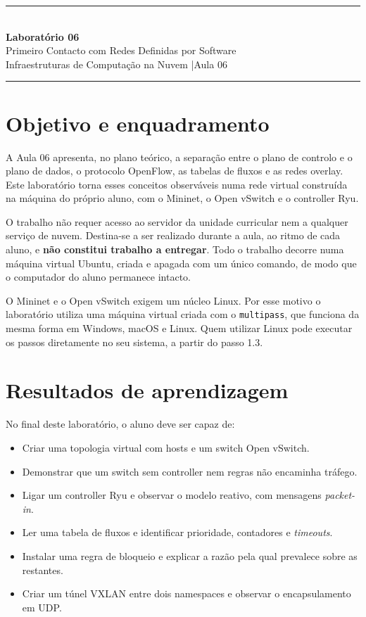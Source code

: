 \documentclass[11pt,a4paper]{article}
\newcommand{\cmd}[1]{\texttt{#1}}
\newcommand{\labtitle}[3]{%
  \thispagestyle{empty}
  \begin{center}
  {\color{NudeTaupe}\rule{\textwidth}{0.5pt}}\\[0.6cm]
  {\LARGE\bfseries\color{TextEspresso} Laboratório #1}\\[0.4cm]
  {\large\color{TextEspresso} #2}\\[0.35cm]
  {\normalsize\color{NudeTaupe} Infraestruturas de Computação na Nuvem \quad|\quad #3}\\[0.5cm]
  {\color{NudeTaupe}\rule{\textwidth}{0.5pt}}
  \end{center}
  \vspace{0.5cm}
}
\begin{document}
\labtitle{06}{Primeiro Contacto com Redes Definidas por Software}{Aula 06}

\section*{Objetivo e enquadramento}

A Aula 06 apresenta, no plano teórico, a separação entre o plano de controlo e o plano de dados, o protocolo OpenFlow, as tabelas de fluxos e as redes overlay. Este laboratório torna esses conceitos observáveis numa rede virtual construída na máquina do próprio aluno, com o Mininet, o Open vSwitch e o controller Ryu.

O trabalho não requer acesso ao servidor da unidade curricular nem a qualquer serviço de nuvem. Destina-se a ser realizado durante a aula, ao ritmo de cada aluno, e \textbf{não constitui trabalho a entregar}. Todo o trabalho decorre numa máquina virtual Ubuntu, criada e apagada com um único comando, de modo que o computador do aluno permanece intacto.

\begin{nota}
O Mininet e o Open vSwitch exigem um núcleo Linux. Por esse motivo o laboratório utiliza uma máquina virtual criada com o \cmd{multipass}, que funciona da mesma forma em Windows, macOS e Linux. Quem utilizar Linux pode executar os passos diretamente no seu sistema, a partir do passo 1.3.
\end{nota}

\section*{Resultados de aprendizagem}

No final deste laboratório, o aluno deve ser capaz de:

\begin{itemize}
  \item Criar uma topologia virtual com hosts e um switch Open vSwitch.
  \item Demonstrar que um switch sem controller nem regras não encaminha tráfego.
  \item Ligar um controller Ryu e observar o modelo reativo, com mensagens \emph{packet-in}.
  \item Ler uma tabela de fluxos e identificar prioridade, contadores e \emph{timeouts}.
  \item Instalar uma regra de bloqueio e explicar a razão pela qual prevalece sobre as restantes.
  \item Criar um túnel VXLAN entre dois namespaces e observar o encapsulamento em UDP.
\end{itemize}
\end{document}
